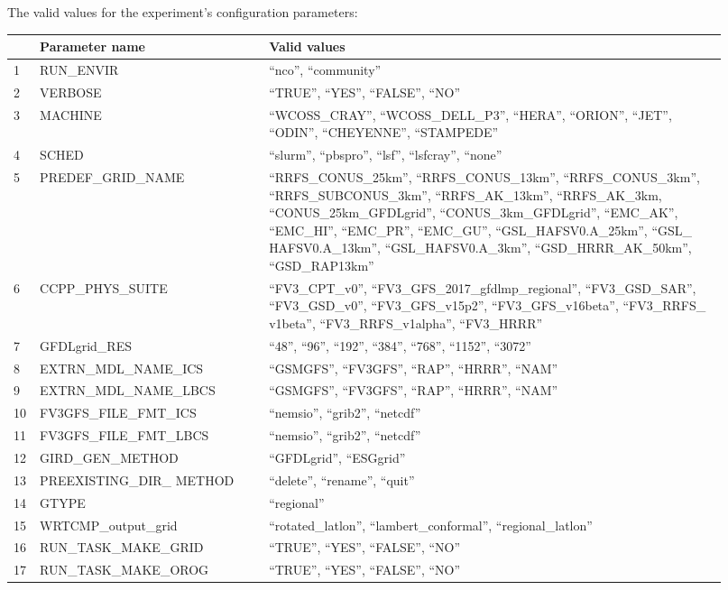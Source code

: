 \documentclass[11pt,fleqn]{report}              %
\begin{document}
The valid values for the experiment's configuration parameters:
{
\scriptsize
\begin{longtable}{p{0.02\linewidth} | p{0.3\linewidth} | p{0.6\linewidth} }
\hline
\hline
 & Parameter name & Valid values   \\
\hline
1 & RUN\_ENVIR & ``nco'', ``community'' \\
2 & VERBOSE & ``TRUE'', ``YES'', ``FALSE'', ``NO''\\
3 & MACHINE & ``WCOSS\_CRAY'', ``WCOSS\_DELL\_P3'', ``HERA'', ``ORION'', ``JET'', ``ODIN'', ``CHEYENNE'', ``STAMPEDE'' \\
4 & SCHED & ``slurm'', ``pbspro'', ``lsf'', ``lsfcray'', ``none'' \\
5 & PREDEF\_GRID\_NAME & ``RRFS\_CONUS\_25km'', ``RRFS\_CONUS\_13km'', ``RRFS\_CONUS\_3km'', ``RRFS\_SUBCONUS\_3km'', ``RRFS\_AK\_13km'', ``RRFS\_AK\_3km, ``CONUS\_25km\_GFDLgrid'', ``CONUS\_3km\_GFDLgrid'', ``EMC\_AK'', ``EMC\_HI'', ``EMC\_PR'', ``EMC\_GU'', ``GSL\_HAFSV0.A\_25km'', ``GSL\_ HAFSV0.A\_13km'', ``GSL\_HAFSV0.A\_3km'',  ``GSD\_HRRR\_AK\_50km'', ``GSD\_RAP13km''  \\
6 & CCPP\_PHYS\_SUITE & ``FV3\_CPT\_v0'', ``FV3\_GFS\_2017\_gfdlmp\_regional'', ``FV3\_GSD\_SAR'', ``FV3\_GSD\_v0'', ``FV3\_GFS\_v15p2'', ``FV3\_GFS\_v16beta'', ``FV3\_RRFS\_ v1beta'', ``FV3\_RRFS\_v1alpha'', ``FV3\_HRRR'' \\
7 & GFDLgrid\_RES & ``48'', ``96'', ``192'', ``384'', ``768'', ``1152'', ``3072'' \\
8 & EXTRN\_MDL\_NAME\_ICS & ``GSMGFS'', ``FV3GFS'', ``RAP'', ``HRRR'', ``NAM'' \\
9 & EXTRN\_MDL\_NAME\_LBCS & ``GSMGFS'', ``FV3GFS'', ``RAP'', ``HRRR'', ``NAM'' \\
10 & FV3GFS\_FILE\_FMT\_ICS & ``nemsio'', ``grib2'', ``netcdf'' \\
11 & FV3GFS\_FILE\_FMT\_LBCS & ``nemsio'', ``grib2'', ``netcdf'' \\
12 & GIRD\_GEN\_METHOD & ``GFDLgrid'', ``ESGgrid''\\
13 & PREEXISTING\_DIR\_ METHOD & ``delete'', ``rename'', ``quit'' \\
14 & GTYPE & ``regional'' \\
15 & WRTCMP\_output\_grid & ``rotated\_latlon'', ``lambert\_conformal'', ``regional\_latlon'' \\
16 & RUN\_TASK\_MAKE\_GRID & ``TRUE'', ``YES'', ``FALSE'', ``NO'' \\
17 & RUN\_TASK\_MAKE\_OROG & ``TRUE'', ``YES'', ``FALSE'', ``NO'' \\

\end{longtable}}
\end{document}

